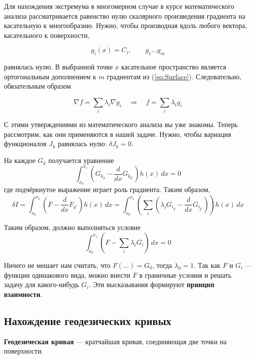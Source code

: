 \documentclass[12pt]{article}
\begin{document}
		Для нахождения экстремума в многомерном случае в курсе математического анализа рассматривается
		равенство нулю скалярного произведения градиента на касательную к многообразию. Нужно, чтобы
		производная вдоль любого вектора, касательного к поверхности,

		\begin{equation}g_i(x) = C_i, \qquad g_1\ldots g_m \label{eq:Surface}\end{equation}

		равнялась нулю. В выбранной точке $x$ касательное пространство является ортогональным дополнением
		к $m$ градиентам из (\ref{eq:Surface}). Следовательно, обязательным образом
		
		$$\nabla f = \sum_i \lambda_i \nabla g_i \quad \Rightarrow \quad f = \sum_i \lambda_i g_i$$

		С этими утверждениями из математического анализа вы уже знакомы. Теперь рассмотрим, как они
		применяются в нашей задаче. Нужно, чтобы вариация функционалов $J_k$ равнялась нулю:
		$\delta J_k = 0$.

		На каждое $G_k$ получается уравнение
		$$\int_{x_0}^{x_1} \left(\underline{G_{k_y} - \frac{d}{dx}G_{k_{y'}}}\right) h(x)\,dx = 0$$	
		где подчёркнутое выражение играет роль градиента. Таким образом,
		$$\delta I = \int_{x_0}^{x_1} \left(F - \frac{d}{dx}F_{y'}\right)h(x) \,dx 
	  	= \int_{x_0}^{x_1} \left(\sum_i \left(\lambda_i G_{i_y} - \frac{d}{dx}G_{i_{y'}} \right)\right)h(x) 			\,dx$$
	  
		Таким образом, должно выполняться условие
		$$\int_{x_0}^{x_1} \left(F - \sum_i \lambda_i G_i\right) \,dx = 0$$

		Ничего не мешает нам считать, что $F(\ldots) = G_0$, тогда $\lambda_0 = 1$. Так как 
		$F$ и $G_i$ --- функции одинакового вида, можно внести $F$ в граничные условия и решать
		задачу для какого-нибудь $G_i$. Эти высказывания формируют \textbf{принцип взаимности}.


	\subsection{Нахождение геодезических кривых}

		\begin{defi}
			\textbf{Геодезическая кривая} --- кратчайшая кривая, соединяющая две точки на поверхности.
		\end{defi}
\end{document}
